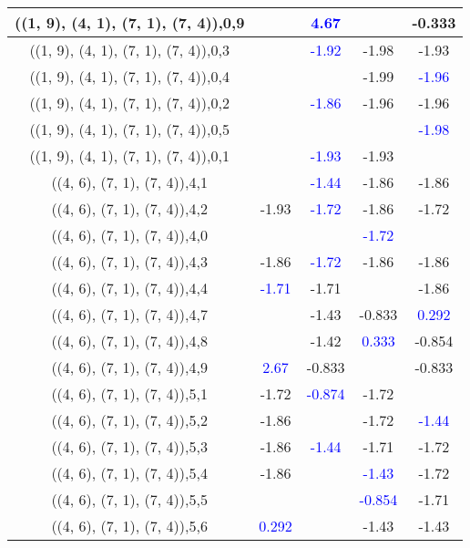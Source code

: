 \documentclass{article}
\begin{document}
\begin{center}
\begin{longtable}{|c|c|c|c|c|}
        	\hline
        	((1, 9), (4, 1), (7, 1), (7, 4)),0,9&& \textcolor{blue}{4.67}&&-0.333\\
        	\hline
        	((1, 9), (4, 1), (7, 1), (7, 4)),0,3&& \textcolor{blue}{-1.92}&-1.98&-1.93\\
        	\hline
        	((1, 9), (4, 1), (7, 1), (7, 4)),0,4&&&-1.99& \textcolor{blue}{-1.96}\\
        	\hline
        	((1, 9), (4, 1), (7, 1), (7, 4)),0,2&& \textcolor{blue}{-1.86}&-1.96&-1.96\\
        	\hline
        	((1, 9), (4, 1), (7, 1), (7, 4)),0,5&&&& \textcolor{blue}{-1.98}\\
        	\hline
        	((1, 9), (4, 1), (7, 1), (7, 4)),0,1&& \textcolor{blue}{-1.93}&-1.93&\\
        	\hline
        	((4, 6), (7, 1), (7, 4)),4,1&& \textcolor{blue}{-1.44}&-1.86&-1.86\\
        	\hline
        	((4, 6), (7, 1), (7, 4)),4,2&-1.93& \textcolor{blue}{-1.72}&-1.86&-1.72\\
        	\hline
        	((4, 6), (7, 1), (7, 4)),4,0&&& \textcolor{blue}{-1.72}&\\
        	\hline
        	((4, 6), (7, 1), (7, 4)),4,3&-1.86& \textcolor{blue}{-1.72}&-1.86&-1.86\\
        	\hline
        	((4, 6), (7, 1), (7, 4)),4,4& \textcolor{blue}{-1.71}&-1.71&&-1.86\\
        	\hline
        	((4, 6), (7, 1), (7, 4)),4,7&&-1.43&-0.833& \textcolor{blue}{0.292}\\
        	\hline
        	((4, 6), (7, 1), (7, 4)),4,8&&-1.42& \textcolor{blue}{0.333}&-0.854\\
        	\hline
        	((4, 6), (7, 1), (7, 4)),4,9& \textcolor{blue}{2.67}&-0.833&&-0.833\\
        	\hline
        	((4, 6), (7, 1), (7, 4)),5,1&-1.72& \textcolor{blue}{-0.874}&-1.72&\\
        	\hline
        	((4, 6), (7, 1), (7, 4)),5,2&-1.86&&-1.72& \textcolor{blue}{-1.44}\\
        	\hline
        	((4, 6), (7, 1), (7, 4)),5,3&-1.86& \textcolor{blue}{-1.44}&-1.71&-1.72\\
        	\hline
        	((4, 6), (7, 1), (7, 4)),5,4&-1.86&& \textcolor{blue}{-1.43}&-1.72\\
        	\hline
        	((4, 6), (7, 1), (7, 4)),5,5&&& \textcolor{blue}{-0.854}&-1.71\\
        	\hline
        	((4, 6), (7, 1), (7, 4)),5,6& \textcolor{blue}{0.292}&&-1.43&-1.43\\

\end{longtable}
\end{center}
\end{document}
